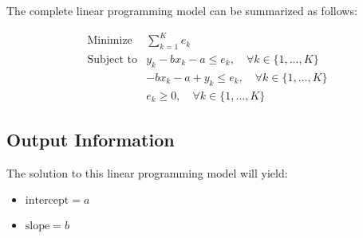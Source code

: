 \documentclass{article}
\begin{document}
The complete linear programming model can be summarized as follows:

\[
\begin{array}{ll}
\text{Minimize} & \sum_{k=1}^{K} e_k \\
\text{Subject to} & y_k - bx_k - a \leq e_k, \quad \forall k \in \{1, \ldots, K\} \\
& -bx_k - a + y_k \leq e_k, \quad \forall k \in \{1, \ldots, K\} \\
& e_k \geq 0, \quad \forall k \in \{1, \ldots, K\}
\end{array}
\]

\subsection*{Output Information}

The solution to this linear programming model will yield:

\begin{itemize}
    \item \( \text{intercept} = a \)
    \item \( \text{slope} = b \)
\end{itemize}
\end{document}
